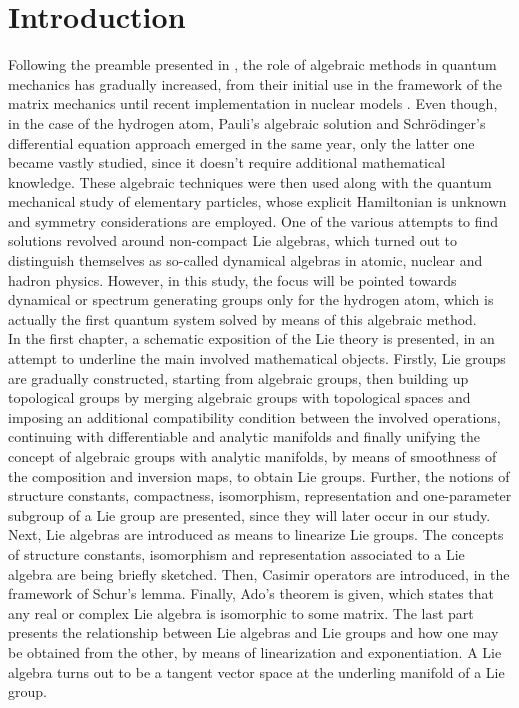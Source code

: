 \documentclass[12pt,a4paper]{report}
\theoremstyle{definition}
\theoremstyle{remark}
\theoremstyle{remark}
\begin{document}
\chapter*{Introduction}
Following the preamble presented in \cite{cizekpaldusadams}, the role of algebraic methods in quantum mechanics has gradually increased, from their initial use in the framework of the matrix mechanics until recent implementation in nuclear models \cite{rowe}. Even though, in the case of the hydrogen atom, Pauli's algebraic solution and Schrödinger's differential equation approach emerged in the same year, only the latter one became vastly studied, since it doesn't require additional mathematical knowledge. These algebraic techniques were then used along with the quantum mechanical study of elementary particles, whose explicit Hamiltonian is unknown and symmetry considerations are employed. One of the various attempts to find solutions revolved around non-compact Lie algebras, which turned out to distinguish themselves as so-called dynamical algebras in atomic, nuclear and hadron physics. However, in this study, the focus will be pointed towards dynamical or spectrum generating groups only for the hydrogen atom, which is actually the first quantum system solved by means of this algebraic method. \\ \indent
In the first chapter, a schematic exposition of the Lie theory is presented, in an attempt to underline the main involved mathematical objects. Firstly, Lie groups are gradually constructed, starting from algebraic groups, then building up topological groups by merging algebraic groups with topological spaces and imposing an additional compatibility condition between the involved operations, continuing with differentiable and analytic manifolds and finally unifying the concept of algebraic groups with analytic manifolds, by means of smoothness of the composition and inversion maps, to obtain Lie groups. Further, the notions of structure constants, compactness, isomorphism, representation and one-parameter subgroup of a Lie group are presented, since they will later occur in our study. Next, Lie algebras are introduced as means to linearize Lie groups. The concepts of structure constants, isomorphism and representation associated to a Lie algebra are being briefly sketched. Then, Casimir operators are introduced, in the framework of Schur's lemma. Finally, Ado's theorem is given, which states that any real or complex Lie algebra is isomorphic to some matrix. The last part presents the relationship between Lie algebras and Lie groups and how one may be obtained from the other, by means of linearization and exponentiation. A Lie algebra turns out to be a tangent vector space at the underling manifold of a Lie group. \\ \indent
\end{document}
